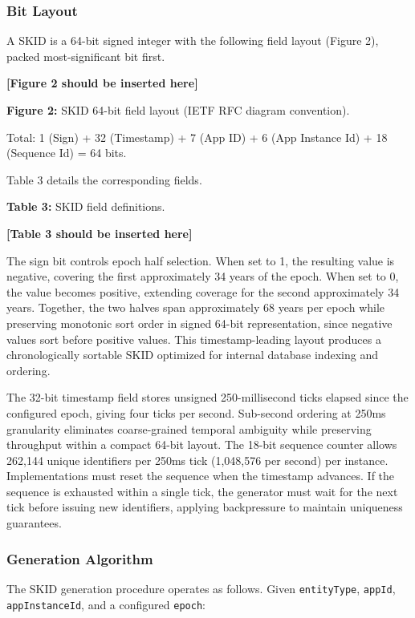 \documentclass[fleqn,10pt,lineno]{wlpeerj}
\begin{document}
\subsubsection{Bit Layout}\label{bit-layout}

A SKID is a 64-bit signed integer with the following field layout
(Figure 2), packed most-significant bit first.

\textbf{{[}Figure 2 should be inserted here{]}}

\textbf{Figure 2:} SKID 64-bit field layout (IETF RFC diagram
convention).

Total: 1 (Sign) + 32 (Timestamp) + 7 (App ID) + 6 (App Instance Id) + 18
(Sequence Id) = 64 bits.

\newpage

Table 3 details the corresponding fields.

\textbf{Table 3:} SKID field definitions.

\textbf{{[}Table 3 should be inserted here{]}}

The sign bit controls epoch half selection. When set to 1, the resulting
value is negative, covering the first approximately 34 years of the
epoch. When set to 0, the value becomes positive, extending coverage for
the second approximately 34 years. Together, the two halves span
approximately 68 years per epoch while preserving monotonic sort order
in signed 64-bit representation, since negative values sort before
positive values. This timestamp-leading layout produces a
chronologically sortable SKID optimized for internal database indexing
and ordering.

The 32-bit timestamp field stores unsigned 250-millisecond ticks elapsed
since the configured epoch, giving four ticks per second. Sub-second
ordering at 250ms granularity eliminates coarse-grained temporal
ambiguity while preserving throughput within a compact 64-bit layout.
The 18-bit sequence counter allows 262,144 unique identifiers per 250ms
tick (1,048,576 per second) per instance. Implementations must reset the
sequence when the timestamp advances. If the sequence is exhausted
within a single tick, the generator must wait for the next tick before
issuing new identifiers, applying backpressure to maintain uniqueness
guarantees.

\subsubsection{Generation Algorithm}\label{generation-algorithm}

The SKID generation procedure operates as follows. Given
\texttt{entityType}, \texttt{appId}, \texttt{appInstanceId}, and a
configured \texttt{epoch}:
\end{document}
